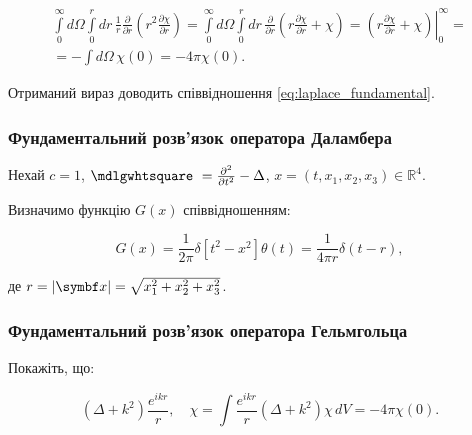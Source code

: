\begin{multline*}
\int\limits_0^\infty d\Omega \int\limits_0^r dr \, \frac{1}{r} \frac{\partial}{\partial r} \left( r^2 \frac{\partial \chi}{\partial r} \right) =
\int\limits_0^\infty d\Omega
\int\limits_0^r dr \, \frac{\partial}{\partial r} \left( r \frac{\partial \chi}{\partial r} + \chi \right) = \left.\left( r \frac{\partial
\chi}{\partial r} +
\chi
\right)\right|_0^\infty = \\ =- \int d\Omega \, \chi(0) = -4\pi \chi(0).
\end{multline*}

Отриманий вираз доводить співвідношення \eqref{eq:laplace_fundamental}.

\subsubsection{Фундаментальний розв’язок оператора Даламбера}

Нехай \( c = 1 \), \( \Dalambertian = \frac{\partial^2}{\partial t^2} - \Delta \), \( x = (t, x_1, x_2, x_3) \in \mathbb{R}^4 \).

Визначимо функцію \( G(x) \) співвідношенням:

\begin{equation}
G(x) = \frac{1}{2\pi} \delta \left[ t^2 - x^2 \right] \theta(t) = \frac{1}{4\pi r} \delta \left( t - r \right),
\label{eq:dalambert_fundamental}
\end{equation}

де \( r = |\vect{x}| = \sqrt{x_1^2 + x_2^2 + x_3^2} \).

%
%

\subsubsection{Фундаментальний розв’язок оператора Гельмгольца}

Покажіть, що:

\begin{equation}
\left( \Delta + k^2 \right) \frac{e^{ikr}}{r}, \quad \chi = \int \frac{e^{ikr}}{r} (\Delta + k^2) \chi \, dV = -4\pi \chi(0).
\label{eq:helmholtz_fundamental}
\end{equation}

